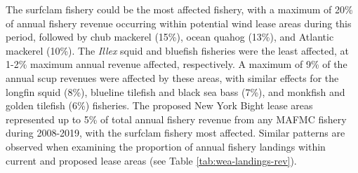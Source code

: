 \documentclass[
  10pt,
]{article}
\let\origtable\table
\let\endorigtable\endtable
\renewenvironment{table}[1][2] {
    \expandafter\origtable\expandafter[H]
} {
    \endorigtable
}
\begin{document}
The surfclam fishery could be the most affected fishery, with a maximum
of 20\% of annual fishery revenue occurring within potential wind lease
areas during this period, followed by chub mackerel (15\%), ocean quahog
(13\%), and Atlantic mackerel (10\%). The \emph{Illex} squid and
bluefish fisheries were the least affected, at 1-2\% maximum annual
revenue affected, respectively. A maximum of 9\% of the annual scup
revenues were affected by these areas, with similar effects for the
longfin squid (8\%), blueline tilefish and black sea bass (7\%), and
monkfish and golden tilefish (6\%) fisheries. The proposed New York
Bight lease areas represented up to 5\% of total annual fishery revenue
from any MAFMC fishery during 2008-2019, with the surfclam fishery most
affected. Similar patterns are observed when examining the proportion of
annual fishery landings within current and proposed lease areas (see
Table \ref{tab:wea-landings-rev}).

\begin{table}

\caption{\label{tab:wea-landings-rev}Top ten species Landings and Revenue from Wind Energy Areas.}
\centering
{}
\end{table}
\end{document}
